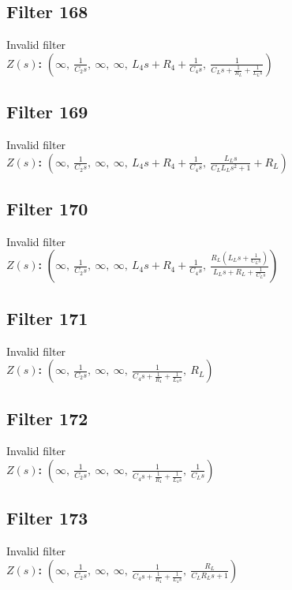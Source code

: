 \documentclass{article}
\begin{document}
\subsection*{Filter 168}
Invalid filter \\ 
\textbf{$Z(s)$:} $\left( \infty, \  \frac{1}{C_{2} s}, \  \infty, \  \infty, \  L_{4} s + R_{4} + \frac{1}{C_{4} s}, \  \frac{1}{C_{L} s + \frac{1}{R_{L}} + \frac{1}{L_{L} s}}\right)$ \\ 
\subsection*{Filter 169}
Invalid filter \\ 
\textbf{$Z(s)$:} $\left( \infty, \  \frac{1}{C_{2} s}, \  \infty, \  \infty, \  L_{4} s + R_{4} + \frac{1}{C_{4} s}, \  \frac{L_{L} s}{C_{L} L_{L} s^{2} + 1} + R_{L}\right)$ \\ 
\subsection*{Filter 170}
Invalid filter \\ 
\textbf{$Z(s)$:} $\left( \infty, \  \frac{1}{C_{2} s}, \  \infty, \  \infty, \  L_{4} s + R_{4} + \frac{1}{C_{4} s}, \  \frac{R_{L} \left(L_{L} s + \frac{1}{C_{L} s}\right)}{L_{L} s + R_{L} + \frac{1}{C_{L} s}}\right)$ \\ 
\subsection*{Filter 171}
Invalid filter \\ 
\textbf{$Z(s)$:} $\left( \infty, \  \frac{1}{C_{2} s}, \  \infty, \  \infty, \  \frac{1}{C_{4} s + \frac{1}{R_{4}} + \frac{1}{L_{4} s}}, \  R_{L}\right)$ \\ 
\subsection*{Filter 172}
Invalid filter \\ 
\textbf{$Z(s)$:} $\left( \infty, \  \frac{1}{C_{2} s}, \  \infty, \  \infty, \  \frac{1}{C_{4} s + \frac{1}{R_{4}} + \frac{1}{L_{4} s}}, \  \frac{1}{C_{L} s}\right)$ \\ 
\subsection*{Filter 173}
Invalid filter \\ 
\textbf{$Z(s)$:} $\left( \infty, \  \frac{1}{C_{2} s}, \  \infty, \  \infty, \  \frac{1}{C_{4} s + \frac{1}{R_{4}} + \frac{1}{L_{4} s}}, \  \frac{R_{L}}{C_{L} R_{L} s + 1}\right)$ \\ 
\end{document}
